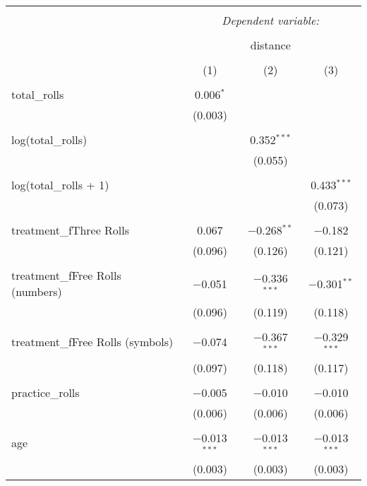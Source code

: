 
\begin{table}[!htbp] \centering 
  \caption{} 
  \label{} 
\begin{tabular}{@{\extracolsep{5pt}}lccc} 
\\[-1.8ex]\hline 
\hline \\[-1.8ex] 
 & \multicolumn{3}{c}{\textit{Dependent variable:}} \\ 
\cline{2-4} 
\\[-1.8ex] & \multicolumn{3}{c}{distance} \\ 
\\[-1.8ex] & (1) & (2) & (3)\\ 
\hline \\[-1.8ex] 
 total\_rolls & 0.006$^{*}$ &  &  \\ 
  & (0.003) &  &  \\ 
  & & & \\ 
 log(total\_rolls) &  & 0.352$^{***}$ &  \\ 
  &  & (0.055) &  \\ 
  & & & \\ 
 log(total\_rolls + 1) &  &  & 0.433$^{***}$ \\ 
  &  &  & (0.073) \\ 
  & & & \\ 
 treatment\_fThree Rolls & 0.067 & $-$0.268$^{**}$ & $-$0.182 \\ 
  & (0.096) & (0.126) & (0.121) \\ 
  & & & \\ 
 treatment\_fFree Rolls (numbers) & $-$0.051 & $-$0.336$^{***}$ & $-$0.301$^{**}$ \\ 
  & (0.096) & (0.119) & (0.118) \\ 
  & & & \\ 
 treatment\_fFree Rolls (symbols) & $-$0.074 & $-$0.367$^{***}$ & $-$0.329$^{***}$ \\ 
  & (0.097) & (0.118) & (0.117) \\ 
  & & & \\ 
 practice\_rolls & $-$0.005 & $-$0.010 & $-$0.010 \\ 
  & (0.006) & (0.006) & (0.006) \\ 
  & & & \\ 
 age & $-$0.013$^{***}$ & $-$0.013$^{***}$ & $-$0.013$^{***}$ \\ 
  & (0.003) & (0.003) & (0.003) \\ 

\end{tabular}
\end{table}
